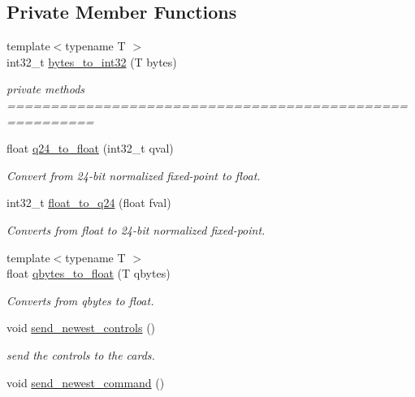 \subsection*{Private Member Functions}
\begin{DoxyCompactItemize}
\item 
{\footnotesize template$<$typename T $>$ }\\int32\+\_\+t \hyperlink{classblmc__drivers_1_1CanBusMotorBoard_ae320518f2cf2c8af0e50220f11556b85}{bytes\+\_\+to\+\_\+int32} (T bytes)
\begin{DoxyCompactList}\small\item\em private methods ======================================================== \end{DoxyCompactList}\item 
float \hyperlink{classblmc__drivers_1_1CanBusMotorBoard_a05db7868ff7034289358cdb774b59720}{q24\+\_\+to\+\_\+float} (int32\+\_\+t qval)
\begin{DoxyCompactList}\small\item\em Convert from 24-\/bit normalized fixed-\/point to float. \end{DoxyCompactList}\item 
int32\+\_\+t \hyperlink{classblmc__drivers_1_1CanBusMotorBoard_ad6d91ccf867e9a3996492cce33270426}{float\+\_\+to\+\_\+q24} (float fval)
\begin{DoxyCompactList}\small\item\em Converts from float to 24-\/bit normalized fixed-\/point. \end{DoxyCompactList}\item 
{\footnotesize template$<$typename T $>$ }\\float \hyperlink{classblmc__drivers_1_1CanBusMotorBoard_ad2cee731d455d64d71014c9821219410}{qbytes\+\_\+to\+\_\+float} (T qbytes)
\begin{DoxyCompactList}\small\item\em Converts from qbytes to float. \end{DoxyCompactList}\item 
void \hyperlink{classblmc__drivers_1_1CanBusMotorBoard_a5ec842674fd543a8c834265433740387}{send\+\_\+newest\+\_\+controls} ()
\begin{DoxyCompactList}\small\item\em send the controls to the cards. \end{DoxyCompactList}\item 
void \hyperlink{classblmc__drivers_1_1CanBusMotorBoard_a9f74868318daf4a97a5266e4d8d6f556}{send\+\_\+newest\+\_\+command} ()\hypertarget{classblmc__drivers_1_1CanBusMotorBoard_a9f74868318daf4a97a5266e4d8d6f556}{}\label{classblmc__drivers_1_1CanBusMotorBoard_a9f74868318daf4a97a5266e4d8d6f556}


\end{DoxyCompactItemize}
